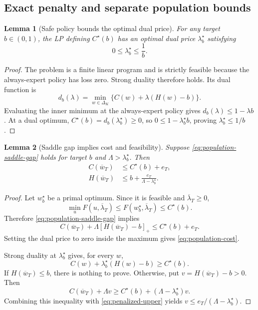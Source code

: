 \documentclass[11pt]{article}
\newtheorem{lemma}{Lemma}
\newcommand{\simplex}{\Delta_K}
\begin{document}
\subsection{Exact penalty and separate population bounds}

\begin{lemma}[Safe policy bounds the optimal dual price]
\label{lem:dual-bound}
For any target $b\in(0,1)$, the LP defining $C^\star(b)$ has an optimal dual
price $\lambda^\star_b$ satisfying
\begin{equation}
  0\le\lambda^\star_b\le\frac1b.
  \label{eq:dual-bound}
\end{equation}
\end{lemma}

\begin{proof}
The problem is a finite linear program and is strictly feasible because the
always-expert policy has loss zero.  Strong duality therefore holds.  Its dual
function is
\[
  d_b(\lambda)
  =\min_{w\in\simplex}
  \{C(w)+\lambda(H(w)-b)\}.
\]
Evaluating the inner minimum at the always-expert policy gives
$d_b(\lambda)\le1-\lambda b$.  At a dual optimum,
$C^\star(b)=d_b(\lambda_b^\star)\ge0$, so
$0\le1-\lambda_b^\star b$, proving
$\lambda_b^\star\le1/b$.
\end{proof}

\begin{lemma}[Saddle gap implies cost and feasibility]
\label{lem:exact-penalty}
Suppose \eqref{eq:population-saddle-gap} holds for target $b$ and
$\Lambda>\lambda_b^\star$.  Then
\begin{align}
  C(\overline w_T)&\le C^\star(b)+e_T,
  \label{eq:population-cost}\\
  H(\overline w_T)&\le
  b+\frac{e_T}{\Lambda-\lambda_b^\star}.
  \label{eq:population-feasibility}
\end{align}
\end{lemma}

\begin{proof}
Let $w_b^\star$ be a primal optimum.  Since it is feasible and
$\overline\lambda_T\ge0$,
\[
  \min_u F(u,\overline\lambda_T)
  \le F(w_b^\star,\overline\lambda_T)
  \le C^\star(b).
\]
Therefore \eqref{eq:population-saddle-gap} implies
\begin{equation}
  C(\overline w_T)
  +\Lambda[H(\overline w_T)-b]_+
  \le C^\star(b)+e_T.
  \label{eq:penalized-upper}
\end{equation}
Setting the dual price to zero inside the maximum gives
\eqref{eq:population-cost}.

Strong duality at $\lambda_b^\star$ gives, for every $w$,
\[
  C(w)+\lambda_b^\star(H(w)-b)\ge C^\star(b).
\]
If $H(\overline w_T)\le b$, there is nothing to prove.  Otherwise, put
$v=H(\overline w_T)-b>0$.  Then
\[
  C(\overline w_T)+\Lambda v
  \ge C^\star(b)+(\Lambda-\lambda_b^\star)v.
\]
Combining this inequality with \eqref{eq:penalized-upper} yields
$v\le e_T/(\Lambda-\lambda_b^\star)$.
\end{proof}
\end{document}
